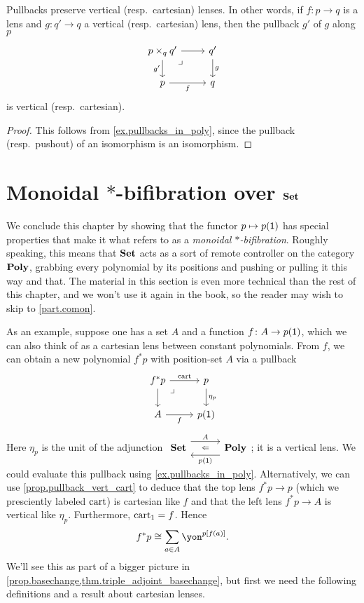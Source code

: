 \documentclass[Book-Poly]{subfiles}
\begin{document}
\begin{proposition}\label{prop.pullback_vert_cart}
Pullbacks preserve vertical (resp.\ cartesian) lenses.
In other words, if $f\colon p\to q$ is a lens and $g\colon q'\to q$ a vertical (resp.\ cartesian) lens, then the pullback $g'$ of $g$ along $p$
\[
\begin{tikzcd}
	p\times_qq'\ar[r]\ar[d, "g'"']&
	q'\ar[d, "g"]\\
	p\ar[r, "f"']&
	q\ar[ul, phantom, very near end, "\lrcorner"]
\end{tikzcd}
\]
is vertical (resp.\ cartesian).
\end{proposition}
\begin{proof}
This follows from \cref{ex.pullbacks_in_poly}, since the pullback (resp.\ pushout) of an isomorphism is an isomorphism.
\end{proof}

\section{Monoidal $*$-bifibration over $\mathbf{Set}$}

We conclude this chapter by showing that the functor $p\mapsto p(\textsf{1})$ has special properties that make it what \cite{shulman2008framed} refers to as a \emph{monoidal $*$-bifibration}.
Roughly speaking, this means that $\mathbf{Set}$ acts as a sort of remote controller on the category $\mathbf{Poly}$, grabbing every polynomial by its positions and pushing or pulling it this way and that.
The material in this section is even more technical than the rest of this chapter, and we won't use it again in the book, so the reader may wish to skip to \cref{part.comon}.

As an example, suppose one has a set $A$ and a function $f\colon A\to p(\textsf{1})$, which we can also think of as a cartesian lens between constant polynomials.
From $f$, we can obtain a new polynomial $f^*p$ with position-set $A$ via a pullback
\begin{equation}\label{eqn.f^*_defined}
\begin{tikzcd}
	f^*p\ar[r, "\fun{cart}"]\ar[d]&
	p\ar[d, "\eta_p"]\\
	A\ar[r, "f"']&
	p(\1)\ar[ul, phantom, very near end, "\lrcorner"]
\end{tikzcd}
\end{equation}
Here $\eta_p$ is the unit of the adjunction $\adjr{\smset}{A}{p(\1)}{\poly}$; it is a vertical lens.
We could evaluate this pullback using \cref{ex.pullbacks_in_poly}.
Alternatively, we can use \cref{prop.pullback_vert_cart} to deduce that the top lens $f^*p\to p$ (which we presciently labeled $\mathrm{cart}$) is cartesian like $f$ and that the left lens $f^*p\to A$ is vertical like $\eta_p$. Furthermore, $\mathrm{cart}_1 = f$.
Hence
\[
    f^*p \iso \sum_{a \in A} \yon^{p[f(a)]}.
\]
We'll see this as part of a bigger picture in \cref{prop.basechange,thm.triple_adjoint_basechange}, but first we need the following definitions and a result about cartesian lenses.
\end{document}
